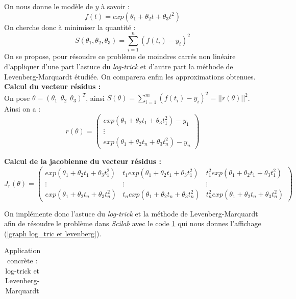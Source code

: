 \documentclass[a4paper,10pt]{report}
\begin{document}
On nous donne le modèle de $y$ à savoir :
\abovedisplayskip=0mm
\begin{displaymath}
f(t)=exp(\theta_1 + \theta_2t + \theta_3t^2)
\end{displaymath}
On cherche donc à minimiser la quantité :
\abovedisplayskip=0mm
\begin{displaymath}
S(\theta_1,\theta_2,\theta_3)=\sum \limits_{i=1}^n (f(t_i)-y_i)^2
\end{displaymath}
On se propose, pour résoudre ce problème de moindres carrés non linéaire d'appliquer d'une part l'astuce du \textit{log-trick} et d'autre part la méthode de Levenberg-Marquardt étudiée. On comparera enfin les approximations obtenues. \\

\textbf{Calcul du vecteur résidus :}\\
On pose $\theta = (\theta_1 \ \ \theta_2 \ \ \theta_3)^T$, ainsi $S(\theta)=\sum \limits_{i=1}^m (f(t_i)-y_i)^2=||r(\theta)||^2$.
Ainsi on a :
\abovedisplayskip=0mm
\begin{displaymath}
r(\theta) = \left( \begin{array}{c} exp(\theta_1+\theta_2 t_1 + \theta_3 t_1^2) -y_1 \\
\vdots \\
exp(\theta_1+\theta_2 t_n + \theta_3 t_n^2) -y_n
 \end{array} \right)
\end{displaymath}

\textbf{Calcul de la jacobienne du vecteur résidus :}\\
\abovedisplayskip=0mm
\begin{displaymath}
J_r(\theta) = \left( \begin{array}{ccc} exp(\theta_1+\theta_2 t_1 + \theta_3 t_1^2) & t_1exp(\theta_1+\theta_2 t_1 + \theta_3 t_1^2)
& t_1^2exp(\theta_1+\theta_2 t_1 + \theta_3 t_1^2) \\
\vdots & \vdots & \vdots \\
exp(\theta_1+\theta_2 t_n + \theta_3 t_n^2) & t_nexp(\theta_1+\theta_2 t_n + \theta_3 t_n^2)
& t_n^2exp(\theta_1+\theta_2 t_n + \theta_3 t_n^2)
 \end{array} \right)
\end{displaymath}

On implémente donc l'astuce du \textit{log-trick} et la méthode de Levenberg-Marquardt afin de résoudre le problème dans \textit{Scilab} avec le code \ref{log_tric et levenberg} qui nous donnes l'affichage (\ref{graph log_tric et levenberg}).
\begin{table}[H]
\caption{Application concrète : log-trick et Levenberg-Marquardt}
\begin{tabular}{l}

\label{log_tric et levenberg}
\end{tabular}
\end{table}
\end{document}
